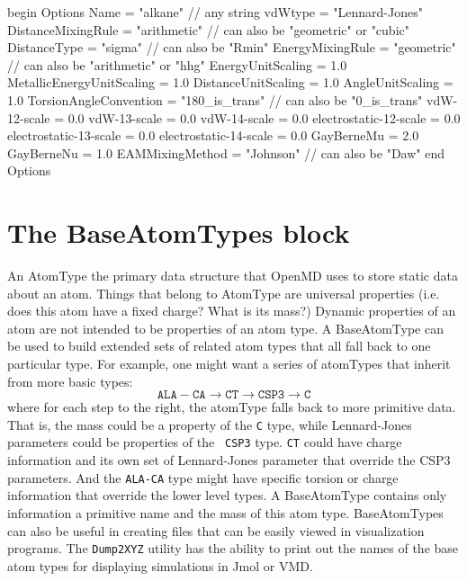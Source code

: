 \documentclass[]{book}
\begin{document}
\begin{code}[caption={[A force field Options block showing default values
for many force field options.] A force field Options block showing default values
for many force field options.  Most of these options do not need to be
specified if the default values are working.},
label={sch:optionsBlock}] 
begin Options
 Name                      = "alkane"       // any string
 vdWtype                   = "Lennard-Jones" 
 DistanceMixingRule        = "arithmetic"   // can also be "geometric" or "cubic"
 DistanceType              = "sigma"        // can also be "Rmin"
 EnergyMixingRule          = "geometric"    // can also be "arithmetic" or "hhg"
 EnergyUnitScaling         = 1.0
 MetallicEnergyUnitScaling = 1.0
 DistanceUnitScaling       = 1.0
 AngleUnitScaling          = 1.0
 TorsionAngleConvention    = "180_is_trans" // can also be "0_is_trans"
 vdW-12-scale              = 0.0
 vdW-13-scale              = 0.0
 vdW-14-scale              = 0.0
 electrostatic-12-scale    = 0.0
 electrostatic-13-scale    = 0.0
 electrostatic-14-scale    = 0.0
 GayBerneMu                = 2.0
 GayBerneNu                = 1.0
 EAMMixingMethod           = "Johnson"      // can also be "Daw"
end Options
\end{code}

\section{\label{section:ffBase}The BaseAtomTypes block}

An AtomType the primary data structure that OpenMD uses to store
static data about an atom.  Things that belong to AtomType are
universal properties (i.e. does this atom have a fixed charge?  What
is its mass?)  Dynamic properties of an atom are not intended to be
properties of an atom type.  A BaseAtomType can be used to build
extended sets of related atom types that all fall back to one
particular type.  For example, one might want a series of atomTypes
that inherit from more basic types:
\begin{displaymath}
\mathtt{ALA-CA} \rightarrow \mathtt{CT} \rightarrow \mathtt{CSP3} \rightarrow \mathtt{C}
\end{displaymath}
where for each step to the right, the atomType falls back to more
primitive data.  That is, the mass could be a property of the {\tt C}
type, while Lennard-Jones parameters could be properties of the {\tt
  CSP3} type.  {\tt CT} could have charge information and its own set
of Lennard-Jones parameter that override the CSP3 parameters.  And the
{\tt ALA-CA} type might have specific torsion or charge information
that override the lower level types.  A BaseAtomType contains only
information a primitive name and the mass of this atom type.
BaseAtomTypes can also be useful in creating files that can be easily
viewed in visualization programs.  The {\tt Dump2XYZ} utility has the
ability to print out the names of the base atom types for displaying
simulations in Jmol or VMD.
\end{document}
